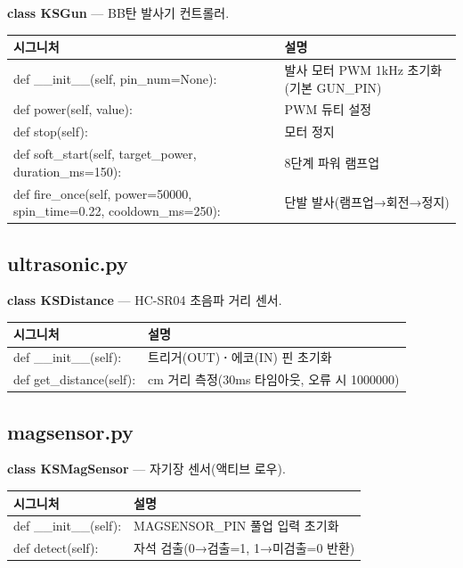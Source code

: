 \noindent\textbf{class KSGun} --- BB탄 발사기 컨트롤러.

\begin{longtable}{S{7.8cm} L{6.2cm}}
\toprule
{}\normalfont\sffamily\bfseries 시그니처 & \normalfont\sffamily\bfseries 설명 \\
\midrule
\endhead
def \_\_init\_\_(self, pin\_num=None): & 발사 모터 PWM 1kHz 초기화(기본 GUN\_PIN) \\
def power(self, value): & PWM 듀티 설정 \\
def stop(self): & 모터 정지 \\
def soft\_start(self, target\_power, duration\_ms=150): & 8단계 파워 램프업 \\
def fire\_once(self, power=50000, spin\_time=0.22, cooldown\_ms=250): & 단발 발사(램프업→회전→정지) \\
\bottomrule
\end{longtable}

\subsection{ultrasonic.py}

\noindent\textbf{class KSDistance} --- HC-SR04 초음파 거리 센서.

\begin{longtable}{S{7.4cm} L{6.6cm}}
\toprule
{}\normalfont\sffamily\bfseries 시그니처 & \normalfont\sffamily\bfseries 설명 \\
\midrule
\endhead
def \_\_init\_\_(self): & 트리거(OUT)\textbf{·}에코(IN) 핀 초기화 \\
def get\_distance(self): & cm 거리 측정(30ms 타임아웃, 오류 시 1000000) \\
\bottomrule
\end{longtable}

\subsection{magsensor.py}

\noindent\textbf{class KSMagSensor} --- 자기장 센서(액티브 로우).

\begin{longtable}{S{7.4cm} L{6.6cm}}
\toprule
{}\normalfont\sffamily\bfseries 시그니처 & \normalfont\sffamily\bfseries 설명 \\
\midrule
\endhead
def \_\_init\_\_(self): & MAGSENSOR\_PIN 풀업 입력 초기화 \\
def detect(self): & 자석 검출(0→검출=1, 1→미검출=0 반환) \\
\bottomrule
\end{longtable}

